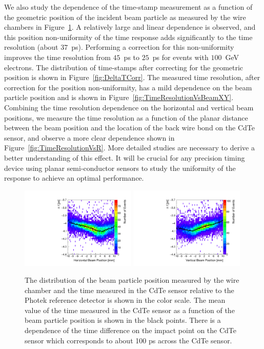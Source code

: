 We also study the dependence of the time-stamp measurement as a function of the geometric
position of the incident beam particle as measured by the wire chambers in 
Figure~\ref{fig:DeltaTVsBeamXY}. A relatively large and linear dependence is observed, 
and this position non-uniformity of the time response adds significantly to the 
time resolution (about $37$~ps). Performing a correction for this non-uniformity improves
the time resolution from $45$~ps to $25$~ps for events with $100$~GeV electrons.
The distribution of time-stamps after correcting for the geometric position is shown
in Figure~\ref{fig:DeltaTCorr}. The measured time resolution, after correction for
the position non-uniformity, has a mild dependence on the beam particle position 
and is shown in Figure~\ref{fig:TimeResolutionVsBeamXY}. Combining the time resolution
dependence on the horizontal and vertical beam positions, we measure the time resolution
as a function of the planar distance between the beam position and the location of the 
back wire bond on the CdTe sensor, and observe a more clear dependence shown in 
Figure~\ref{fig:TimeResolutionVsR}. More detailed studies are necessary
to derive a better understanding of this effect. It will be crucial for any precision timing device
using planar semi-conductor sensors to study the uniformity of the response to achieve an optimal performance.
%
\begin{figure}[htbp] 
\centering
\includegraphics[width=0.49\textwidth]{figures/DeltaTVsHorizontalPosition.pdf} 
\includegraphics[width=0.49\textwidth]{figures/DeltaTVsVerticalPosition.pdf} 
\caption{ The distribution of the beam particle position measured by the wire chamber
and the time measured in the CdTe sensor relative to the Photek reference detector
is shown in the color scale. The mean value of the time measured in the CdTe sensor as a function
of the beam particle position is shown in the black points. There is a dependence of the time difference
on the impact point on the CdTe sensor which corresponds to about 100 ps across the CdTe sensor.} 
\label{fig:DeltaTVsBeamXY} 
\end{figure} 

